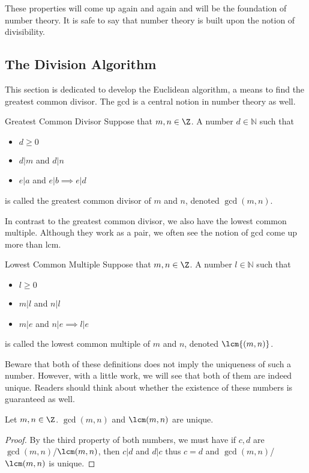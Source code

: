 \documentclass[a4paper]{article}
\begin{document}
These properties will come up again and again and will be the foundation of number theory. It is safe to say that number theory is built upon the notion of divisibility. 

\subsection{The Division Algorithm}
This section is dedicated to develop the Euclidean algorithm, a means to find the greatest common divisor. The gcd is a central notion in number theory as well. 
\begin{defn}{Greatest Common Divisor}{} Suppose that $m,n\in\Z$. A number $d\in\mathbb{N}$ such that 
\begin{itemize}
\item $d\geq 0$
\item $d|m$ and $d|n$
\item $e|a$ and $e|b\implies e|d$
\end{itemize}
is called the greatest common divisor of $m$ and $n$, denoted $\gcd{(m,n)}$.
\end{defn}

In contrast to the greatest common divisor, we also have the lowest common multiple. Although they work as a pair, we often see the notion of gcd come up more than lcm. 

\begin{defn}{Lowest Common Multiple}{} Suppose that $m,n\in\Z$. A number $l\in\mathbb{N}$ such that 
\begin{itemize}
\item $l\geq 0$
\item $m|l$ and $n|l$
\item $m|e$ and $n|e\implies l|e$
\end{itemize}
is called the lowest common multiple of $m$ and $n$, denoted $\lcm{(m,n)}$.
\end{defn}

Beware that both of these definitions does not imply the uniqueness of such a number. However, with a little work, we will see that both of them are indeed unique. Readers should think about whether the existence of these numbers is guaranteed as well. 

\begin{prp}{}{} Let $m,n\in\Z$. $\gcd(m,n)$ and $\lcm(m,n)$ are unique. \tcbline
\begin{proof}
By the third property of both numbers, we must have if $c,d$ are $\gcd(m,n)$/$\lcm(m,n)$, then $c|d$ and $d|c$ thus $c=d$ and $\gcd(m,n)$/$\lcm(m,n)$ is unique. 
\end{proof}
\end{prp}
\end{document}
